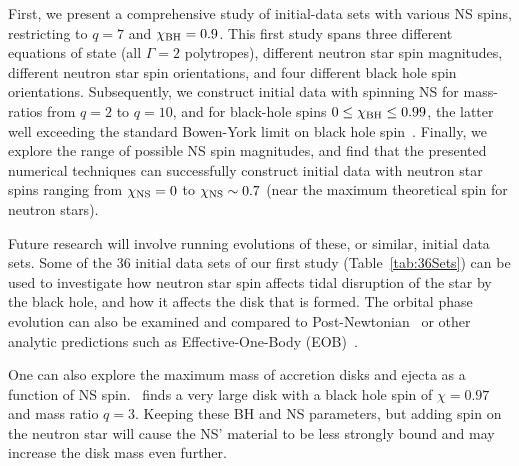 First, we present a comprehensive study of initial-data sets with various NS spins, restricting to $q=7$ and $\chi_{\rm BH}=0.9$.
This first study spans three different equations of state (all
$\Gamma=2$ polytropes), different neutron star spin magnitudes,
different neutron star spin orientations, and four different black
hole spin orientations. Subsequently, we construct initial data with
spinning NS for mass-ratios from $q=2$ to $q=10$, and for black-hole
spins $0\le \chi_{\rm BH}\le 0.99$, the latter well exceeding the
standard Bowen-York limit on black hole
spin~\citep{Lovelace2008,DainEtAl:2008}. Finally, we explore the range
of possible NS spin magnitudes, and find that the presented numerical
techniques can successfully construct initial data with neutron star
spins ranging from $\chi_{\rm NS}=0$ to $\chi_{\rm NS}\sim0.7$ (near
the maximum theoretical spin for neutron stars).

Future research will involve running evolutions of these, or similar,
initial data sets. Some of the 36 initial data sets of our first study
(Table~\ref{tab:36Sets}) can be used to investigate how neutron star
spin affects tidal disruption of the star by the black hole, and how
it affects the disk that is formed. The orbital phase evolution can
also be examined and compared to Post-Newtonian~\citep{Blanchet2014} or
other analytic predictions such as Effective-One-Body
(EOB)~\citep{Buonanno99,Taracchini:2013rva,Pan:2013rra}. 


One can also explore the maximum mass of accretion disks and ejecta as
a function of NS spin.~\cite{Lovelace:2013vma} finds a very large
disk with a black hole spin of $\chi=0.97$ and mass ratio $q=3$. Keeping these BH and NS parameters, but adding spin on the neutron star will cause the NS' material to be less strongly bound and may increase the disk mass even further.



